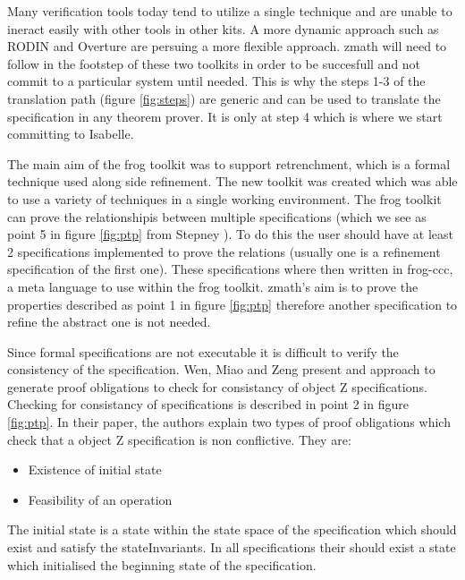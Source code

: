 Many verification tools today tend to utilize a single technique and are unable to ineract easily with other tools in other kits. A more dynamic approach such as RODIN \cite{Jones05j} and Overture \cite{overture} are persuing a more flexible approach. \gls{zmath} will need to follow in the footstep of these two toolkits in order to be succesfull and not commit to a particular system until needed. This is why the steps 1-3 of the translation path (figure \ref{fig:steps}) are generic and can be used to translate the specification in any theorem prover. It is only at step 4 which is where we start committing to Isabelle.

The main aim of the frog toolkit was to support retrenchment, which is a formal technique used along side refinement. The new toolkit was created which was able to use a variety of techniques in a single working environment. The frog toolkit can prove the relationshipis between multiple specifications (which we see as point 5 in figure \ref{fig:ptp} from Stepney \cite{stepney1998tale}). To do this the user should have at least 2 specifications implemented to prove the relations (usually one is a refinement specification of the first one). These specifications where then written in frog-ccc, a meta language to use within the frog toolkit. \gls{zmath}'s aim is to prove the properties described as point 1 in figure \ref{fig:ptp} therefore another specification to refine the abstract one is not needed.

Since formal specifications are not executable it is difficult to verify the consistency of the specification. Wen, Miao and Zeng \cite{DBLP:conf/icsea/WenMZ06} present and approach to generate proof obligations to check for consistancy of object Z specifications. Checking for consistancy of specifications is described in point 2 in figure \ref{fig:ptp}. In their paper, the authors explain two 
types of proof obligations which check that a object Z specification is non conflictive. They are:

\begin{itemize}
\item Existence of initial state

\item Feasibility of an operation
\end{itemize}

The initial state is a state within the state space of the specification which should exist and satisfy the stateInvariants. In all specifications their should exist a state which initialised the beginning state of the specification.


